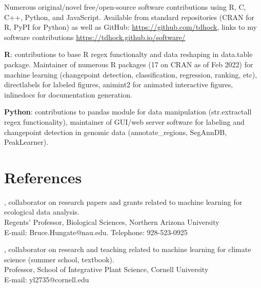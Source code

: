 \documentclass[margin,line]{res}
\begin{document}
\begin{resume}
Numerous original/novel free/open-source software contributions using R, C, C++,
Python, and JavaScript. Available from standard repositories (CRAN for
R, PyPI for Python) as well as GitHub:
\url{https://github.com/tdhock}, links to my software contributions
\url{https://tdhock.github.io/software/}

{\bf R}: contributions to base R regex functionalty and data reshaping
in data.table package. Maintainer of numerous R packages (17 on CRAN
as of Feb 2022) for machine learning (changepoint detection,
classification, regression, ranking, etc), directlabels for labeled
figures, animint2 for animated interactive figures, inlinedocs for
documentation generation.

{\bf Python}: contributions to pandas module for data manipulation
(str.extractall regex functionality), maintainer of GUI/web server
software for labeling and changepoint detection in genomic data
(annotate\_regions, SegAnnDB, PeakLearner).



\section{\sc References}
 
, collaborator on research papers and grants related to machine learning for ecological data analysis. \\
Regents' Professor, Biological Sciences, Northern Arizona University\\
E-mail: Bruce.Hungate@nau.edu. Telephone: 928-523-0925

, collaborator on research and teaching related to machine learning for climate science (summer school, textbook).\\
Professor, School of Integrative Plant Science, Cornell University\\
E-mail: yl2735@cornell.edu


\end{resume}
\end{document}
